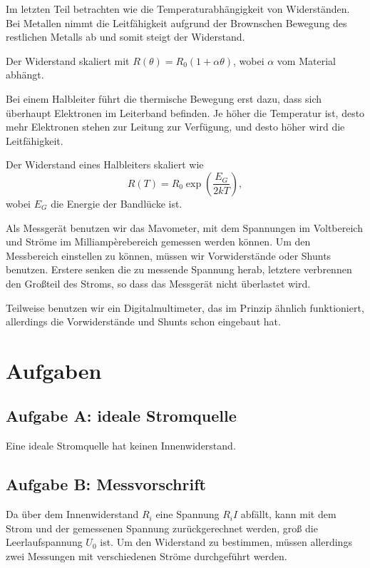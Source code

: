 \documentclass[11pt,german]{article}
\begin{document}
Im letzten Teil betrachten wie die Temperaturabhängigkeit von Widerständen. Bei Metallen nimmt die Leitfähigkeit aufgrund der Brownschen Bewegung des restlichen Metalls ab und somit steigt der Widerstand.

Der Widerstand skaliert mit $R(\theta) = R_0 (1 + \alpha \theta)$, wobei $\alpha$ vom Material abhängt.

Bei einem Halbleiter führt die thermische Bewegung erst dazu, dass sich
überhaupt Elektronen im Leiterband befinden. Je höher die Temperatur ist, desto
mehr Elektronen stehen zur Leitung zur Verfügung, und desto höher wird die
Leitfähigkeit.

Der Widerstand eines Halbleiters skaliert wie
\[ R(T) = R_0 \exp \left( \frac{E_G}{2 k T} \right), \]
wobei $E_G$ die Energie der Bandlücke ist.

Als Messgerät benutzen wir das Mavometer, mit dem Spannungen im Voltbereich und Ströme im Milliampèrebereich gemessen werden können. Um den Messbereich einstellen zu können, müssen wir Vorwiderstände oder Shunts benutzen. Erstere senken die zu messende Spannung herab, letztere verbrennen den Großteil des Stroms, so dass das Messgerät nicht überlastet wird.

Teilweise benutzen wir ein Digitalmultimeter, das im Prinzip ähnlich funktioniert, allerdings die Vorwiderstände und Shunts schon eingebaut hat.


\section{Aufgaben}

\subsection{Aufgabe A: ideale Stromquelle}

Eine ideale Stromquelle hat keinen Innenwiderstand.

\subsection{Aufgabe B: Messvorschrift}

Da über dem Innenwiderstand $R_i$ eine Spannung $R_i I$ abfällt, kann
mit dem Strom und der gemessenen Spannung zurückgerechnet werden, groß
die Leerlaufspannung $U_0$ ist. Um den Widerstand zu bestimmen, müssen
allerdings zwei Messungen mit verschiedenen Ströme durchgeführt werden.
\end{document}
